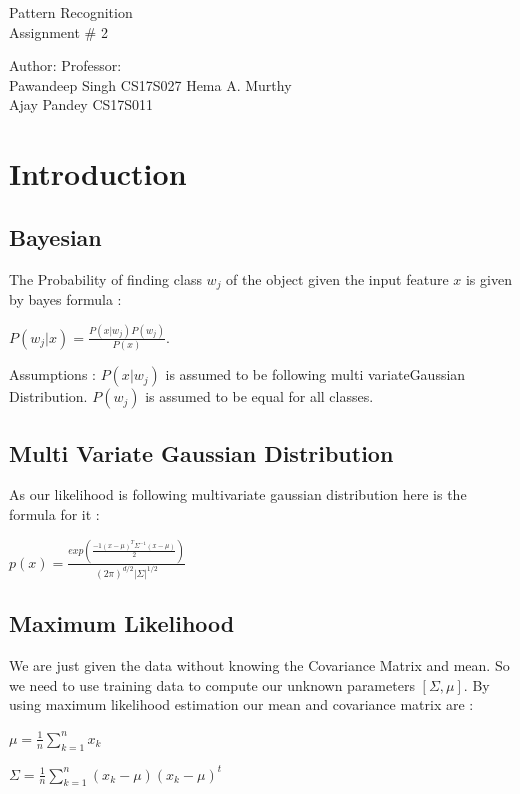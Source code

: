 \documentclass[12pt]{article}
\begin{document}
	\begin{center}
		\vspace*{10mm}
		{\Huge Pattern Recognition \\}
		\vspace{5mm}
		{\huge Assignment \# 2 \\}
		\vspace{20mm}
	\end{center}
	{\large Author}: \hfill \hfill {\large Professor:} \\
	{\large Pawandeep Singh CS17S027  \hfill \hfill  Hema A. Murthy\\
		Ajay Pandey CS17S011}
	\vspace*{\fill}
	\newpage
	
	\section{Introduction}
		\subsection{Bayesian}
			\large{The Probability of finding class $ w_j$ of the object given the input feature $x$ is given by bayes formula :}\\ \par
			\large{$P(w_j | x)=\frac{P(x|w_j)P(w_j)}{P(x)}$.} \\ \par
			Assumptions : $P(x|w_j)$ is assumed to be following multi variateGaussian Distribution.
			$P(w_j)$ is  assumed to be equal for all classes.\\
			\subsection{Multi Variate Gaussian Distribution}
			As our likelihood is following multivariate gaussian distribution here is the formula for it :\\ \par
			\large{$p(x) = \frac{exp(\frac{-1(x-\mu)^T\Sigma^{-1}(x-\mu)} {2})}{(2\pi)^{d/2} |\Sigma|^{1/2}}$}\\ \par
			\subsection{Maximum Likelihood}
			We are just given the data without knowing the Covariance Matrix and mean. So we need to use training data to compute our unknown parameters $[\Sigma,\mu]$. By using maximum likelihood estimation our mean and covariance matrix are : \\ \par
			$\mu = \frac{1}{n} \sum_{k=1}^{n}x_k$ \\ \par
			$\Sigma = \frac{1}{n} \sum_{k=1}^{n}(x_k - \mu)(x_k - \mu)^t$
			\newpage
\end{document}
